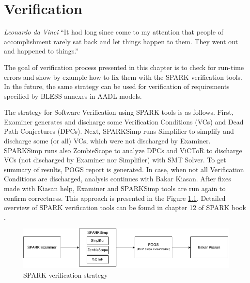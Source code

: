 
\cleardoublepage

\chapter{Verification}
\label{verification}

\begin{chapquote}{\textit{Leonardo da Vinci}}
``It had long since come to my attention that people of accomplishment rarely sat back and let things happen to them. They went out and happened to things.''
\end{chapquote}

The goal of verification process presented in this chapter is to check for run-time errors and show by example how to fix them with the SPARK verification tools. In the future, the same strategy can be used for verification of requirements specified by BLESS annexes in AADL models.

The strategy for Software Verification using SPARK tools is as follows. First, Examiner generates and discharge some Verification Conditions (VCs) and Dead Path Conjectures (DPCs). Next, SPARKSimp runs Simplifier to simplify and discharge some (or all) VCs, which were not discharged by Examiner. SPARKSimp runs also ZombieScope to analyze DPCs and ViCToR to discharge VCs (not discharged by Examiner nor Simplifier) with SMT Solver. To get summary of results, POGS report is generated. In case, when not all Verification Conditions are discharged, analysis continues with Bakar Kiasan. After fixes made with Kiasan help, Examiner and SPARKSimp tools are run again to confirm correctness. This approach is presented in the Figure \ref{figure:sparkverificationstrategy}. Detailed overview of SPARK verification tools can be found in chapter 12 of SPARK book \cite{Barnes:Book}.

\begin{figure}[ht]%
    \begin{center}
        \includegraphics[width=1.0\textwidth]{figures/spark-verification.png}        
    \end{center}
    \caption{SPARK verification strategy}
    \label{figure:sparkverificationstrategy}
\end{figure}

